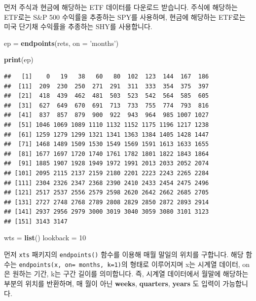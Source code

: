\documentclass[12pt,]{book}
\newenvironment{Shaded}{\begin{snugshade}}{\end{snugshade}}
\newcommand{\DataTypeTok}[1]{\textcolor[rgb]{0.13,0.29,0.53}{#1}}
\newcommand{\DecValTok}[1]{\textcolor[rgb]{0.00,0.00,0.81}{#1}}
\newcommand{\KeywordTok}[1]{\textcolor[rgb]{0.13,0.29,0.53}{\textbf{#1}}}
\newcommand{\NormalTok}[1]{#1}
\newcommand{\StringTok}[1]{\textcolor[rgb]{0.31,0.60,0.02}{#1}}
\begin{document}
먼저 주식과 현금에 해당하는 ETF 데이터를 다운로드 받습니다. 주식에 해당하는 ETF로는 S\&P 500 수익률을 추종하는 SPY를 사용하며, 현금에 해당하는 ETF로는 미국 단기채 수익률을 추종하는 SHY를 사용합니다.

\begin{Shaded}
\begin{Highlighting}[]
\NormalTok{ep =}\StringTok{ }\KeywordTok{endpoints}\NormalTok{(rets, }\DataTypeTok{on =} \StringTok{'months'}\NormalTok{)}

\KeywordTok{print}\NormalTok{(ep)}
\end{Highlighting}
\end{Shaded}

\begin{verbatim}
##   [1]    0   19   38   60   80  102  123  144  167  186
##  [11]  209  230  250  271  291  311  333  354  375  397
##  [21]  418  439  462  481  503  523  542  564  585  605
##  [31]  627  649  670  691  713  733  755  774  793  816
##  [41]  837  857  879  900  922  943  964  985 1007 1027
##  [51] 1046 1069 1089 1110 1132 1152 1175 1196 1217 1238
##  [61] 1259 1279 1299 1321 1341 1363 1384 1405 1428 1447
##  [71] 1468 1489 1509 1530 1549 1569 1591 1613 1633 1655
##  [81] 1677 1697 1720 1740 1761 1782 1801 1822 1843 1864
##  [91] 1885 1907 1928 1949 1972 1991 2013 2033 2052 2074
## [101] 2095 2115 2137 2159 2180 2201 2223 2243 2265 2284
## [111] 2304 2326 2347 2368 2390 2410 2433 2454 2475 2496
## [121] 2517 2537 2556 2579 2598 2620 2642 2662 2685 2705
## [131] 2727 2748 2768 2789 2808 2829 2850 2872 2893 2914
## [141] 2937 2956 2979 3000 3019 3040 3059 3080 3101 3123
## [151] 3143 3147
\end{verbatim}

\begin{Shaded}
\begin{Highlighting}[]
\NormalTok{wts =}\StringTok{ }\KeywordTok{list}\NormalTok{()}
\NormalTok{lookback =}\StringTok{ }\DecValTok{10}
\end{Highlighting}
\end{Shaded}

먼저 \texttt{xts} 패키지의 \texttt{endpoints()} 함수를 이용해 매월 말일의 위치를 구합니다. 해당 함수는 \texttt{endpoints(x,\ on=\ \textquotesingle{}months\textquotesingle{},\ k=1)}의 형태로 이루어지며 x는 시계열 데이터, on은 원하는 기간, k는 구간 길이를 의미합니다. 즉, 시계열 데이터에서 월말에 해당하는 부분의 위치를 반환하며, 매 월이 아닌 \textbf{weeks}, \textbf{quarters}, \textbf{years} 도 입력이 가능합니다.
\end{document}
